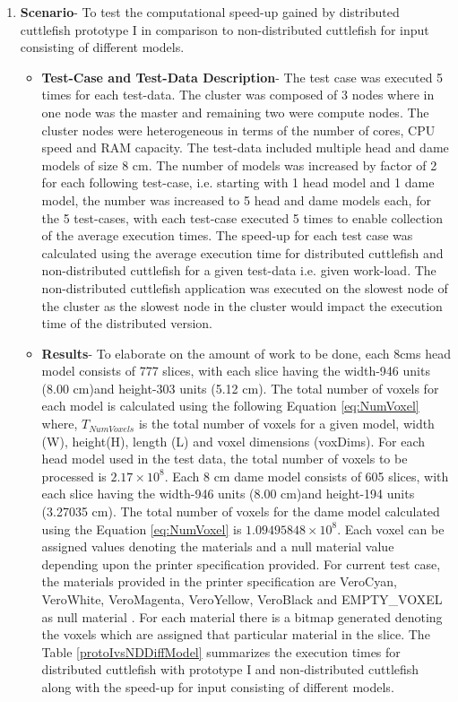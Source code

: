 \begin{enumerate}
\item{\textbf{Scenario}}- To test the computational speed-up gained by distributed cuttlefish prototype I in comparison to non-distributed cuttlefish for input consisting of different models.
\begin{itemize}
\item{\textbf{Test-Case and Test-Data Description}}- The test case was executed 5 times for each test-data. The cluster was composed of 3 nodes where in one node was the master and remaining two were compute nodes. The cluster nodes were heterogeneous in terms of the number of cores, CPU speed and RAM capacity. The test-data included multiple head and dame models of size 8 cm. The number of models was increased by factor of 2 for each following test-case, i.e. starting with 1 head model and 1 dame model, the number was increased to 5 head and dame models each, for the 5 test-cases, with each test-case executed 5 times to enable collection of the average execution times. The speed-up for each test case was calculated using the average execution time for distributed cuttlefish and non-distributed cuttlefish for a given test-data i.e. given work-load. The non-distributed cuttlefish application was executed on the slowest node of the cluster as the slowest node in the cluster would impact the execution time of the distributed version. 
\item{\textbf{Results}}- To elaborate on the amount of work to be done, each 8cms head model consists of 777 slices, with each slice having the width-946 units (8.00 cm)and height-303 units (5.12 cm). The total number of voxels for each model is calculated using the following Equation \ref{eq:NumVoxel} where, \begin{math} T_{NumVoxels} \end{math} is the total number of voxels for a given model, width (W), height(H), length (L) and voxel dimensions (voxDims). For each head model used in the test data, the total number of voxels to be processed is \begin{math} 2.17 \times 10^{8} \end{math}. Each 8 cm dame model consists of 605 slices, with each slice having the width-946 units (8.00 cm)and height-194 units (3.27035 cm). The total number of voxels for the dame model calculated using the Equation \ref{eq:NumVoxel} is  \begin{math} 1.09495848 \times 10^{8} \end{math}. Each voxel can be assigned values denoting the materials and a null material value depending upon the printer specification provided. For current test case, the materials provided in the printer specification are VeroCyan, VeroWhite, VeroMagenta, VeroYellow, VeroBlack and EMPTY\_VOXEL as null material . For each material there is a bitmap generated denoting the voxels which are assigned that particular material in the slice. The Table \ref{protoIvsNDDiffModel} summarizes the execution times for distributed cuttlefish with prototype I and non-distributed cuttlefish along with the speed-up for input consisting of different models.  

\end{itemize}
\end{enumerate}
